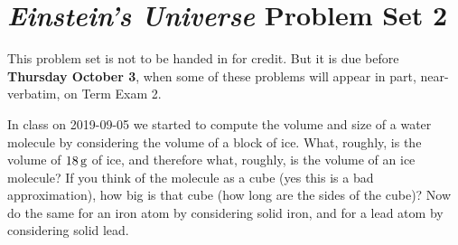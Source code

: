 \documentclass[12pt, letterpaper]{article}
\begin{document}
\section*{\textsl{Einstein's Universe} Problem Set 2}

This problem set is not to be handed in for credit. But it is due
before \textbf{Thursday October 3}, when some of these problems
will appear in part, near-verbatim, on Term Exam 2.

\begin{problem}
In class on 2019-09-05 we started to compute the volume and size of a
water molecule by considering the volume of a block of ice. What,
roughly, is the volume of $18\,\mathrm{g}$ of ice, and therefore what,
roughly, is the volume of an ice molecule? If you think of the
molecule as a cube (yes this is a bad approximation), how big is that
cube (how long are the sides of the cube)? Now do the same for an iron
atom by considering solid iron, and for a lead atom by considering
solid lead.
\end{problem}
\end{document}

